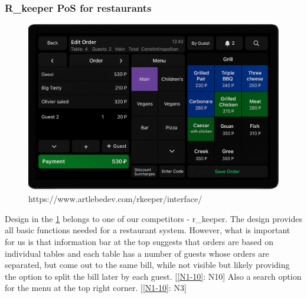 \documentclass{article}
\begin{document}
\subsubsection{R\_keeper PoS for restaurants}
\begin{figure}[H]
    \centering
    \includegraphics[width=0.9\linewidth]{HCI/images/rkeeper.png}
    \caption{https://www.artlebedev.com/rkeeper/interface/}
    \label{fig:restUI1}
\end{figure}
\noindent
Design in the \cref{fig:restUI1} belongs to one of our competitors - r\_keeper. The design provides all basic functions needed for a restaurant system. However, what is important for us is that information bar at the top suggests that orders are based on individual tables and each table has a number of guests whose orders are separated, but come out to the same bill, while not visible but likely providing the option to split the bill later by each guest. [\cref{N1-10}: N10] Also a search option for the menu at the top right corner. [\cref{N1-10}: N3]
\end{document}
